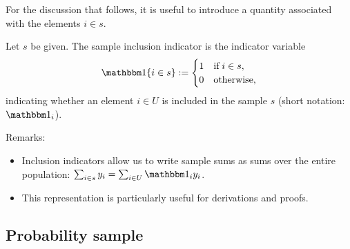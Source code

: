 \documentclass{my_eth_beamer}
\numberwithin{equation}{section}
\begin{document}
\begin{frame}
    For the discussion that follows, it is useful to introduce a
    \alert{quantity associated with the elements} $i \in s$.
    \vspace{0.5em}
    \begin{Def}
        Let $s$ be given. The \alert{sample inclusion indicator} is the
        indicator variable
        \begin{equation*}
            \indicator\{i \in s\} := \begin{cases}
                1 & \text{if}\; i \in s,\\
                0 & \text{otherwise,}
            \end{cases}
        \end{equation*}
        \noindent indicating whether an element $i \in U$ is included in the
        sample $s$ (short notation: $\indicator_i$).
    \end{Def}
    Remarks:
    \vspace{0.15em}
    \begin{itemize}
    \setlength{\itemsep}{5pt}
        \item Inclusion indicators allow us to write sample sums as sums over
            the entire population: $\sum_{i \in s} y_i = \sum_{i \in U}
            \indicator_i y_i$.
        \item This representation is particularly useful for derivations and
            proofs.
    \end{itemize}
\end{frame}

\subsection{Probability sample}\label{sec:basics_randomsample}
\end{document}
